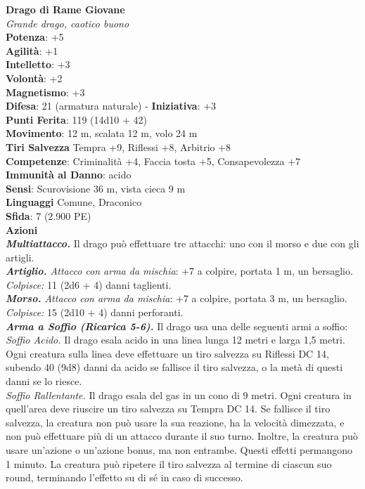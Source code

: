 \begin{multicols}{2}
\medskip\textbf{Drago di Rame Giovane}\\
\emph{Grande drago, caotico buono}\\
\textbf{Potenza}: +5\\
\textbf{Agilità}: +1\\
\textbf{Intelletto}: +3\\
\textbf{Volontà}: +2\\
\textbf{Magnetismo}: +3\\
\textbf{Difesa}: 21 (armatura naturale) - \textbf{Iniziativa}: +3\\
\textbf{Punti Ferita}: 119 (14d10 + 42)\\
\textbf{Movimento}: 12 m, scalata 12 m, volo 24 m\\
\textbf{Tiri Salvezza} Tempra +9, Riflessi +8, Arbitrio +8\\
\textbf{Competenze}: Criminalità +4, Faccia tosta +5, Consapevolezza +7\\
\textbf{Immunità al Danno}: acido\\
\textbf{Sensi}: Scurovisione 36 m, vista cieca 9 m\\
\textbf{Linguaggi} Comune, Draconico\\
\textbf{Sfida}: 7 (2.900 PE)\smallskip\\
\smallskip\textbf{Azioni}\\
\emph{\textbf{Multiattacco.}} Il drago può effettuare tre attacchi: uno con il morso e due con gli artigli.\\
\emph{\textbf{Artiglio.} Attacco con arma da mischia}: +7 a colpire, portata 1 m, un bersaglio.\\
\emph{Colpisce:} 11 (2d6 + 4) danni taglienti.\\
\emph{\textbf{Morso.} Attacco con arma da mischia}: +7 a colpire, portata 3 m, un bersaglio.\\
\emph{Colpisce:} 15 (2d10 + 4) danni perforanti.\\
\emph{\textbf{Arma a Soffio (Ricarica 5-6).}} Il drago usa una delle seguenti armi a soffio:\\
\emph{Soffio Acido.} Il drago esala acido in una linea lunga 12 metri e larga 1,5 metri. Ogni creatura sulla linea deve effettuare un tiro salvezza su Riflessi DC 14, subendo 40 (9d8) danni da acido se fallisce il tiro salvezza, o la metà di questi danni se lo riesce.\\
\emph{Soffio Rallentante.} Il drago esala del gas in un cono di 9 metri. Ogni creatura in quell'area deve riuscire un tiro salvezza su Tempra DC 14. Se fallisce il tiro salvezza, la creatura non può usare la sua reazione, ha la velocità dimezzata, e non può effettuare più di un attacco durante il suo turno. Inoltre, la creatura può usare un'azione o un'azione bonus, ma non entrambe. Questi effetti permangono 1 minuto. La creatura può ripetere il tiro salvezza al termine di ciascun suo round, terminando l'effetto su di sé in caso di successo.\\

\end{multicols}
